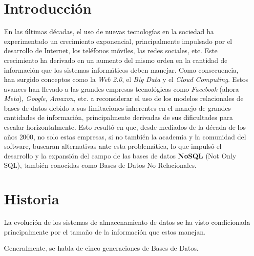 \documentclass[pdflatex,sn-mathphys-num]{sn-jnl}
\theoremstyle{thmstyleone}%
\theoremstyle{thmstyletwo}%
\theoremstyle{thmstylethree}%
\begin{document}

\maketitle

\section{Introducción}\label{sec1}

En las últimas décadas, el uso de nuevas tecnologías en la sociedad ha experimentado un crecimiento exponencial, principalmente impulsado por el desarrollo de Internet, los teléfonos móviles, las redes sociales, etc. Este crecimiento ha derivado en un aumento del mismo orden en la cantidad de información que los sistemas informáticos deben manejar. Como consecuencia, han surgido conceptos como la \textit{Web 2.0}, el \textit{Big Data} y el \textit{Cloud Computing}. Estos avances han llevado a las grandes empresas tecnológicas como \textit{Facebook} (ahora \textit{Meta}), \textit{Google}, \textit{Amazon}, etc. a reconsiderar el uso de los modelos relacionales de bases de datos debido a sus limitaciones inherentes en el manejo de grandes cantidades de información, principalmente derivadas de sus dificultades para escalar horizontalmente. Esto resultó en que, desde mediados de la década de los años 2000, no solo estas empresas, si no también la academia y la comunidad del software, buscaran alternativas ante esta problemática, lo que impulsó el desarrollo y la expansión del campo de las bases de datos \textbf{NoSQL} (Not Only SQL), también conocidas como Bases de Datos No Relacionales.

\section{Historia}\label{sec2}

La evolución de los sistemas de almacenamiento de datos se ha visto condicionada principalmente por el tamaño de la información que estos manejan\cite{grafo2021}.

Generalmente, se habla de cinco generaciones de Bases de Datos.
\end{document}

